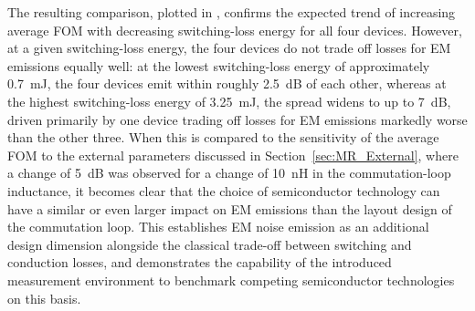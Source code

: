 The resulting comparison, plotted in , confirms the expected trend of increasing average FOM with decreasing switching-loss energy for all four devices.
However, at a given switching-loss energy, the four devices do not trade off losses for EM emissions equally well: at the lowest switching-loss energy of approximately \SI{0.7}{mJ}, the four devices emit within roughly \SI{2.5}{dB} of each other, whereas at the highest switching-loss energy of \SI{3.25}{mJ}, the spread widens to up to \SI{7}{dB}, driven primarily by one device trading off losses for EM emissions markedly worse than the other three.
When this is compared to the sensitivity of the average FOM to the external parameters discussed in Section~\ref{sec:MR_External}, where a change of \SI{5}{dB} was observed for a change of \SI{10}{nH} in the commutation-loop inductance, it becomes clear that the choice of semiconductor technology can have a similar or even larger impact on EM emissions than the layout design of the commutation loop.
This establishes EM noise emission as an additional design dimension alongside the classical trade-off between switching and conduction losses, and demonstrates the capability of the introduced measurement environment to benchmark competing semiconductor technologies on this basis.

\FloatBarrier